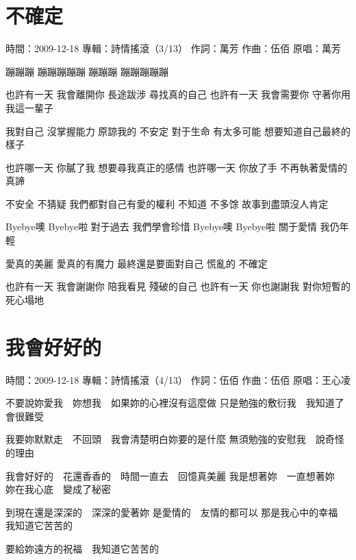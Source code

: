 \documentclass[UTF8,a4paper,oneside,twocolumn,12pt]{ctexbook}
\newcommand{\infopair}[2]{\textbullet #1：#2}
\newcommand{\zc}[1][伍佰]{\infopair{作詞}{#1}}
\newcommand{\zq}[1][伍佰]{\infopair{作曲}{#1}}
\newcommand{\zj}[1]{\infopair{專輯}{#1}}
\newcommand{\yc}[1]{\infopair{原唱}{#1}}
\newcommand{\sj}[1]{\infopair{時間}{#1}}
\newenvironment{info}{\begin{flushleft}\kaishu
	}
	{\end{flushleft}\normalsize\yahei\par}
\newenvironment{lyric}{
	}
{}
\begin{document}
\section{不確定}
\begin{info}
	\sj{2009-12-18}
	\zj{詩情搖滾（3/13）}
	\zc[萬芳]
	\zq
	\yc{萬芳}
\end{info}
\begin{lyric}
	蹦蹦蹦 蹦蹦蹦蹦蹦 蹦蹦蹦 蹦蹦蹦蹦蹦

	也許有一天 我會離開你
	長途跋涉 尋找真的自己
	也許有一天 我會需要你
	守著你用我這一輩子

	我對自己 沒掌握能力
	原諒我的 不安定
	對于生命 有太多可能
	想要知道自己最終的樣子

	也許哪一天 你膩了我
	想要尋我真正的感情
	也許哪一天 你放了手
	不再執著愛情的真諦

	不安全 不猜疑
	我們都對自己有愛的權利
	不知道 不多馀
	故事到盡頭沒人肯定

	Byebye噢 Byebye啦
	對于過去 我們學會珍惜
	Byebye噢 Byebye啦
	關于愛情 我仍年輕

	愛真的美麗 愛真的有魔力
	最終還是要面對自己
	慌亂的 不確定

	也許有一天 我會謝謝你
	陪我看見 殘破的自己
	也許有一天 你也謝謝我
	對你短暫的死心塌地
\end{lyric}

\section{我會好好的}
\begin{info}
	\sj{2009-12-18}
	\zj{詩情搖滾（4/13）}
	\zc
	\zq
	\yc{王心凌}
\end{info}
\begin{lyric}
	不要說妳愛我　妳想我　如果妳的心裡沒有這麼做
	只是勉強的敷衍我　我知道了會很難受

	我要妳默默走　不回頭　我會清楚明白妳要的是什麼
	無須勉強的安慰我　說奇怪的理由

	我會好好的　花還香香的　時間一直去　回憶真美麗
	我是想著妳　一直想著妳　妳在我心底　變成了秘密

	到現在還是深深的　深深的愛著妳
	是愛情的　友情的都可以
	那是我心中的幸福　我知道它苦苦的

	要給妳遠方的祝福　我知道它苦苦的
\end{lyric}
\end{document}
